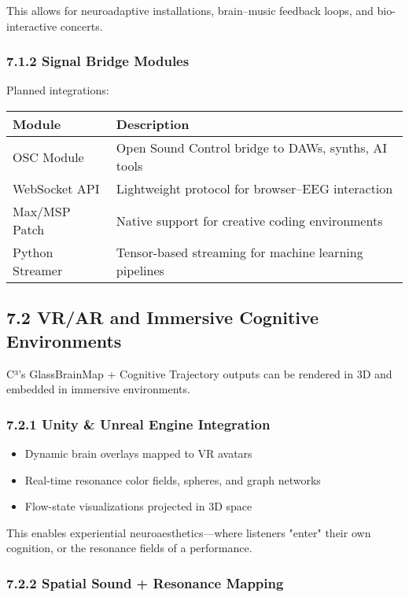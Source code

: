 This allows for neuroadaptive installations, brain–music feedback loops, and bio-interactive concerts.

\subsubsection*{7.1.2 Signal Bridge Modules}

Planned integrations:

\begin{center}
\begin{tabular}{|l|p{9cm}|}
\hline
\textbf{Module} & \textbf{Description} \\
\hline
OSC Module & Open Sound Control bridge to DAWs, synths, AI tools \\
WebSocket API & Lightweight protocol for browser–EEG interaction \\
Max/MSP Patch & Native support for creative coding environments \\
Python Streamer & Tensor-based streaming for machine learning pipelines \\
\hline
\end{tabular}
\end{center}

\subsection*{7.2 VR/AR and Immersive Cognitive Environments}

C³’s GlassBrainMap + Cognitive Trajectory outputs can be rendered in 3D and embedded in immersive environments.

\subsubsection*{7.2.1 Unity \& Unreal Engine Integration}

\begin{itemize}
    \item Dynamic brain overlays mapped to VR avatars
    \item Real-time resonance color fields, spheres, and graph networks
    \item Flow-state visualizations projected in 3D space
\end{itemize}

This enables experiential neuroaesthetics—where listeners "enter" their own cognition, or the resonance fields of a performance.

\subsubsection*{7.2.2 Spatial Sound + Resonance Mapping}

